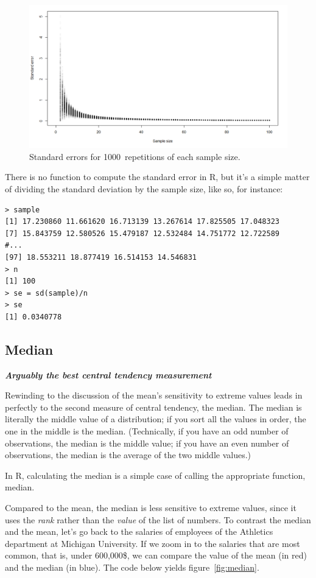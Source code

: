 \documentclass{report}
\newcommand{\code}[1]{\textsf{\ttfamily #1}}
\newcommand{\notefor}[1]{\hfill\textbf{\textit{#1}}}
\begin{document}
			\begin{figure}[h]
				\centering
				\includegraphics[width=1.0\textwidth]{standard_error.png}
				\caption{Standard errors for 1000~repetitions of each sample size.}
				\label{fig:ste}
			\end{figure}
		
			There is no function to compute the standard error in R, but it's a simple matter of dividing the standard deviation by the sample size, like so, for instance:
			
			\begin{verbatim}
> sample
[1] 17.230860 11.661620 16.713139 13.267614 17.825505 17.048323
[7] 15.843759 12.580526 15.479187 12.532484 14.751772 12.722589
#...
[97] 18.553211 18.877419 16.514153 14.546831
> n
[1] 100
> se = sd(sample)/n
> se
[1] 0.0340778
			\end{verbatim}
			
		\subsection{Median}
		\notefor{Arguably the best central tendency measurement}
		
		Rewinding to the discussion of the mean's sensitivity to extreme values leads in perfectly to the second measure of central tendency, the median. The median is literally the middle value of a distribution; if you sort all the values in order, the one in the middle is the median. (Technically, if you have an odd number of observations, the median is the middle value; if you have an even number of observations, the median is the average of the two middle values.)
		
		In R, calculating the median is a simple case of calling the appropriate function, \code{median}.
		
		Compared to the mean, the median is less sensitive to extreme values, since it uses the \emph{rank} rather than the \emph{value} of the list of numbers. To contrast the median and the mean, let's go back to the salaries of employees of the Athletics department at Michigan University. If we zoom in to the salaries that are most common, that is, under 600,000\$, we can compare the value of the mean (in red) and the median (in blue). The code below yields figure~\ref{fig:median}.
		
\end{document}
